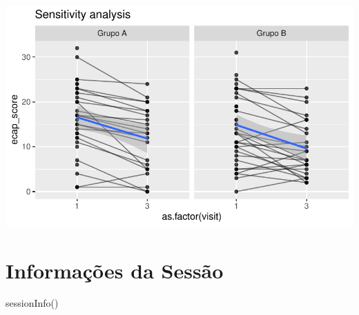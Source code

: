\documentclass[
  letterpaper,
  DIV=11,
  numbers=noendperiod]{scrartcl}
\newenvironment{Shaded}{\begin{snugshade}}{\end{snugshade}}
\newcommand{\FunctionTok}[1]{\textcolor[rgb]{0.28,0.35,0.67}{#1}}
\newcommand{\NormalTok}[1]{\textcolor[rgb]{0.00,0.23,0.31}{#1}}
\begin{document}
\includegraphics{Outcomes_V1V2V3_files/figure-pdf/ecap_score_6-2.pdf}

\section{Informações da Sessão}\label{informauxe7uxf5es-da-sessuxe3o}

\begin{Shaded}
\begin{Highlighting}[]
\FunctionTok{sessionInfo}\NormalTok{()}
\end{Highlighting}
\end{Shaded}
\end{document}
